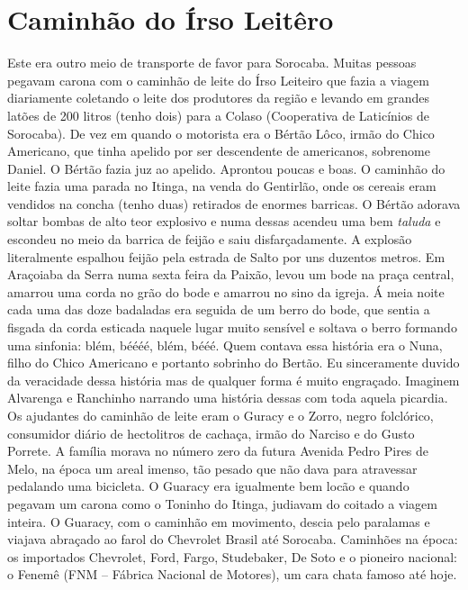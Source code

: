 \documentclass[12pt,brazil,]{book}
\begin{document}
\section{Caminhão do Írso
Leitêro}\label{caminhuxe3o-do-uxedrso-leituxearo}

Este era outro meio de transporte de favor para Sorocaba. Muitas pessoas
pegavam carona com o caminhão de leite do Írso Leiteiro que fazia a
viagem diariamente coletando o leite dos produtores da região e levando
em grandes latões de 200 litros (tenho dois) para a Colaso (Cooperativa
de Laticínios de Sorocaba). De vez em quando o motorista era o Bértão
Lôco, irmão do Chico Americano, que tinha apelido por ser descendente de
americanos, sobrenome Daniel. O Bértão fazia juz ao apelido. Aprontou
poucas e boas. O caminhão do leite fazia uma parada no Itinga, na venda
do Gentirlão, onde os cereais eram vendidos na concha (tenho duas)
retirados de enormes barricas. O Bértão adorava soltar bombas de alto
teor explosivo e numa dessas acendeu uma bem \emph{taluda} e escondeu no
meio da barrica de feijão e saiu disfarçadamente. A explosão
literalmente espalhou feijão pela estrada de Salto por uns duzentos
metros. Em Araçoiaba da Serra numa sexta feira da Paixão, levou um bode
na praça central, amarrou uma corda no grão do bode e amarrou no sino da
igreja. Á meia noite cada uma das doze badaladas era seguida de um berro
do bode, que sentia a fisgada da corda esticada naquele lugar muito
sensível e soltava o berro formando uma sinfonia: blém, béééé, blém,
bééé. Quem contava essa história era o Nuna, filho do Chico Americano e
portanto sobrinho do Bertão. Eu sinceramente duvido da veracidade dessa
história mas de qualquer forma é muito engraçado. Imaginem Alvarenga e
Ranchinho narrando uma história dessas com toda aquela picardia. Os
ajudantes do caminhão de leite eram o Guracy e o Zorro, negro
folclórico, consumidor diário de hectolitros de cachaça, irmão do
Narciso e do Gusto Porrete. A família morava no número zero da futura
Avenida Pedro Pires de Melo, na época um areal imenso, tão pesado que
não dava para atravessar pedalando uma bicicleta. O Guaracy era
igualmente bem locão e quando pegavam um carona como o Toninho do
Itinga, judiavam do coitado a viagem inteira. O Guaracy, com o caminhão
em movimento, descia pelo paralamas e viajava abraçado ao farol do
Chevrolet Brasil até Sorocaba. Caminhões na época: os importados
Chevrolet, Ford, Fargo, Studebaker, De Soto e o pioneiro nacional: o
Fenemê (FNM -- Fábrica Nacional de Motores), um cara chata famoso até
hoje.
\end{document}
